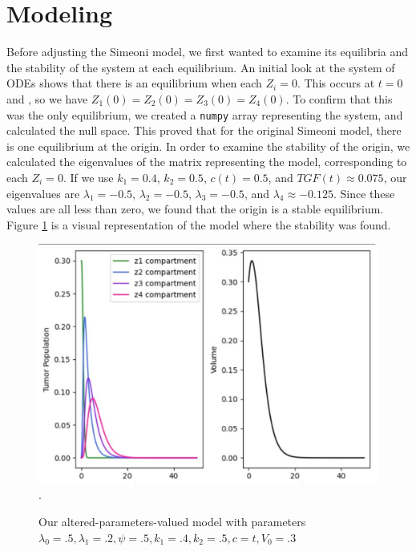 \documentclass[11pt]{amsart}
\begin{document}
\section{Modeling}
Before adjusting the Simeoni model, we first wanted to examine its equilibria and the stability of the system at each equilibrium. An initial look at the system of ODEs shows that there is an equilibrium when each $Z_i = 0$. This occurs at $t=0$ and , so we have $Z_1(0) = Z_2(0) = Z_3(0) = Z_4(0)$. To confirm that this was the only equilibrium, we created a \verb!numpy! array representing the system, and calculated the null space. This proved that for the original Simeoni model, there is one equilibrium at the origin. In order to examine the stability of the origin, we calculated the eigenvalues of the matrix representing the model, corresponding to each $Z_i = 0$. If we use $k_1 = 0.4$, $k_2 = 0.5$, $c(t) = 0.5$, and $TGF(t) \approx 0.075$, our eigenvalues are $\lambda_1 = -0.5$, $\lambda_2 = -0.5$, $\lambda_3 = -0.5$, and $\lambda_4 \approx -0.125$. Since these values are all less than zero, we found that the origin is a stable equilibrium. Figure \ref{fig:1} is a visual representation of the model where the stability was found.
\begin{figure}[h]

\begin{center} %
\includegraphics[width=\textwidth]{original_tumor_random_parameters.pdf}. %
\end{center}
\caption{Our altered-parameters-valued model with parameters $\lambda_0=.5, \lambda_1=.2, \psi=.5, k_1 = .4, k_2=.5, c=t, V_0 = .3$}
\label{fig:1}
\end{figure}
\end{document}

